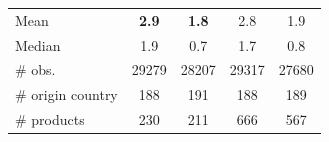 \documentclass[10 pt,Helvetica, french]{beamer}
\begin{document}
\begin{frame}[label=slide_results_summary]
\begin{table}[htbp]
{\begin{center}
\begin{tabular}{l|cc|cc}
    Mean  & \bf{2.9} & \bf{1.8} & 2.8 & 1.9 \\
    Median & 1.9 & 0.7 & 1.7 & 0.8 \\ \hline
    \# obs. & 29279 & 28207 & 29317 & 27680 \\
    \# origin country & 188 & 191 & 188 & 189 \\
    \# products & 230 & 211 & 666 & 567 \\    \hline \hline
  \end{tabular}
\end{center}}
  \end{table}%
 \end{frame}
\end{document}
